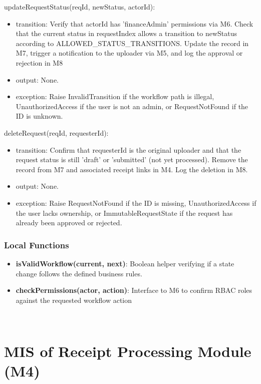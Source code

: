 \documentclass[12pt, titlepage]{article}
\begin{document}
\noindent updateRequestStatus(reqId, newStatus, actorId):
\begin{itemize}
  \item transition: Verify that actorId has 'financeAdmin' permissions via M6. Check that the current status in requestIndex allows a transition to newStatus according to ALLOWED\_STATUS\_TRANSITIONS. Update the record in M7, trigger a notification to the uploader via M5, and log the approval or rejection in M8
  \item output: None.
  \item exception: Raise InvalidTransition if the workflow path is illegal, UnauthorizedAccess if the user is not an admin, or RequestNotFound if the ID is unknown.
\end{itemize}

\noindent deleteRequest(reqId, requesterId):
\begin{itemize}
  \item transition: Confirm that requesterId is the original uploader and that the request status is still 'draft' or 'submitted' (not yet processed). Remove the record from M7 and associated receipt links in M4. Log the deletion in M8.
  \item output: None.
  \item exception: Raise RequestNotFound if the ID is missing, UnauthorizedAccess if the user lacks ownership, or ImmutableRequestState if the request has already been approved or rejected.
\end{itemize}

\subsubsection{Local Functions}

\begin{itemize}
  \item \textbf{isValidWorkflow(current, next)}: Boolean helper verifying if a state change follows the defined business rules.
  \item \textbf{checkPermissions(actor, action)}: Interface to M6 to confirm RBAC roles against the requested workflow action
\end{itemize}


~\newpage

\section{MIS of Receipt Processing Module (M4)} \label{ModuleReceiptProcessing}
\end{document}
